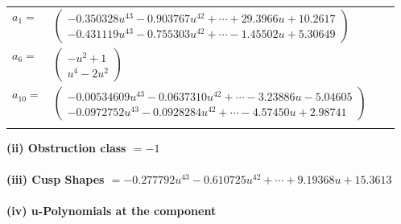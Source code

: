\documentclass[1p]{elsarticle_modified}
\theoremstyle{definition}
\begin{document}
\begin{tabular}{m{7pt} m{180pt} m{7pt} m{180pt} }
\flushright $a_{1}=$&$\begin{pmatrix}-0.350328 u^{43}-0.903767 u^{42}+\cdots+29.3966 u+10.2617\\-0.431119 u^{43}-0.755303 u^{42}+\cdots-1.45502 u+5.30649\end{pmatrix}$ \\
\flushright $a_{6}=$&$\begin{pmatrix}- u^2+1\\u^4-2 u^2\end{pmatrix}$ \\
\flushright $a_{10}=$&$\begin{pmatrix}-0.00534609 u^{43}-0.0637310 u^{42}+\cdots-3.23886 u-5.04605\\-0.0972752 u^{43}-0.0928284 u^{42}+\cdots-4.57450 u+2.98741\end{pmatrix}$\\&\end{tabular}
\flushleft \textbf{(ii) Obstruction class $= -1$}\\~\\
\flushleft \textbf{(iii) Cusp Shapes $= -0.277792 u^{43}-0.610725 u^{42}+\cdots+9.19368 u+15.3613$}\\~\\
\newpage\renewcommand{\arraystretch}{1}
\flushleft \textbf{(iv) u-Polynomials at the component}\newline \\
\end{document}
